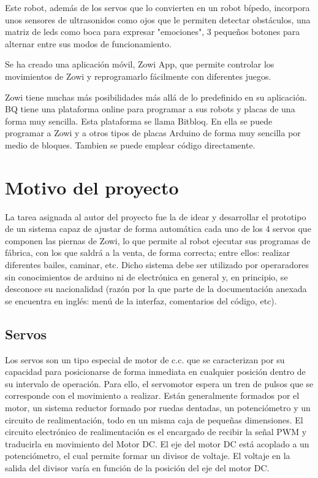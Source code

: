 Este robot, además de los servos que lo convierten en un robot bípedo, incorpora unos sensores de ultrasonidos como ojos que le permiten detectar obstáculos, una matriz de leds como boca para expresar "emociones", 3 pequeños botones para alternar entre sus modos de funcionamiento.

Se ha creado una aplicación móvil, Zowi App, que permite controlar los movimientos de Zowi y reprogramarlo fácilmente con diferentes juegos.

Zowi tiene muchas más posibilidades más allá de lo predefinido en su aplicación. BQ tiene una plataforma online para programar a sus robots y placas de una forma muy sencilla. Esta plataforma se llama Bitbloq. En ella se puede programar a Zowi y a otros tipos de placas Arduino de forma muy sencilla por medio de bloques. Tambien se puede emplear código directamente.

\section{Motivo del proyecto}
La tarea asignada al autor del proyecto fue la de idear y desarrollar el prototipo de un sistema capaz de ajustar de forma automática cada uno de los 4 servos que componen las piernas de Zowi, lo que permite al robot ejecutar sus programas de fábrica, con los que saldrá a la venta, de forma correcta; entre ellos: realizar diferentes bailes, caminar, etc. Dicho sistema debe ser utilizado por operaradores sin conocimientos de arduino ni de electrónica en general y, en principio, se desconoce su nacionalidad (razón por la que parte de la documentación anexada se encuentra en inglés: menú de la interfaz, comentarios del código, etc).

\subsection{Servos}
Los servos son un tipo especial de motor de c.c. que se caracterizan por su capacidad para posicionarse de forma inmediata en cualquier posición dentro de su intervalo de operación. Para ello, el servomotor espera un tren de pulsos que se corresponde con el movimiento a realizar. Están generalmente formados por el motor, un sistema reductor formado por ruedas dentadas, un potenciómetro y un circuito de realimentación, todo en un misma caja de pequeñas dimensiones.
El circuito electrónico de realimentación es el encargado de recibir la señal PWM y traducirla en movimiento del Motor DC. El eje del motor DC está acoplado a un potenciómetro, el cual permite formar un divisor de voltaje. El voltaje en la salida del divisor varía en función de la posición del eje del motor DC.

